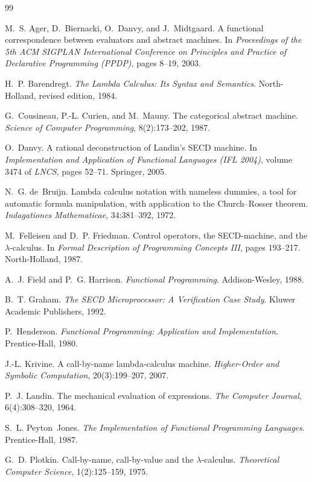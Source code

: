 \documentclass[11pt,a4paper]{article}
\theoremstyle{definition}
\theoremstyle{plain}
\begin{document}
\begin{thebibliography}{99}
\small

M.~S. Ager, D.~Biernacki, O.~Danvy, and J.~Midtgaard.
\newblock A functional correspondence between evaluators and abstract machines.
\newblock In \emph{Proceedings of the 5th ACM SIGPLAN International Conference
  on Principles and Practice of Declarative Programming (PPDP)}, pages 8--19, 2003.

H.~P. Barendregt.
\newblock \emph{The Lambda Calculus: Its Syntax and Semantics}.
\newblock North-Holland, revised edition, 1984.

G.~Cousineau, P.-L. Curien, and M.~Mauny.
\newblock The categorical abstract machine.
\newblock \emph{Science of Computer Programming}, 8(2):173--202, 1987.

O.~Danvy.
\newblock A rational deconstruction of {L}andin's {SECD} machine.
\newblock In \emph{Implementation and Application of Functional Languages
  (IFL 2004)}, volume 3474 of \emph{LNCS}, pages 52--71. Springer, 2005.

N.~G. de~Bruijn.
\newblock Lambda calculus notation with nameless dummies, a tool for automatic
  formula manipulation, with application to the {C}hurch--{R}osser theorem.
\newblock \emph{Indagationes Mathematicae}, 34:381--392, 1972.

M.~Felleisen and D.~P. Friedman.
\newblock Control operators, the {SECD}-machine, and the $\lambda$-calculus.
\newblock In \emph{Formal Description of Programming Concepts III}, pages
  193--217. North-Holland, 1987.

A.~J. Field and P.~G. Harrison.
\newblock \emph{Functional Programming}.
\newblock Addison-Wesley, 1988.

B.~T. Graham.
\newblock \emph{The SECD Microprocessor: A Verification Case Study}.
\newblock Kluwer Academic Publishers, 1992.

P.~Henderson.
\newblock \emph{Functional Programming: Application and Implementation}.
\newblock Prentice-Hall, 1980.

J.-L. Krivine.
\newblock A call-by-name lambda-calculus machine.
\newblock \emph{Higher-Order and Symbolic Computation}, 20(3):199--207, 2007.

P.~J. Landin.
\newblock The mechanical evaluation of expressions.
\newblock \emph{The Computer Journal}, 6(4):308--320, 1964.

S.~L. Peyton~Jones.
\newblock \emph{The Implementation of Functional Programming Languages}.
\newblock Prentice-Hall, 1987.

G.~D. Plotkin.
\newblock Call-by-name, call-by-value and the $\lambda$-calculus.
\newblock \emph{Theoretical Computer Science}, 1(2):125--159, 1975.

\end{thebibliography}
\end{document}
